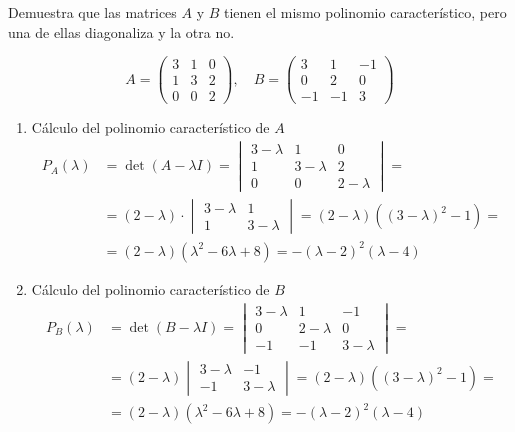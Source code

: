 \documentclass[12pt]{article}
\begin{document}
	\begin{ejercicio}[2 puntos]
		Demuestra que las matrices $A$ y $B$ tienen el mismo polinomio característico, pero una de ellas diagonaliza y la otra no.
		
		\[
		A = \begin{pmatrix}
			3 & 1 & 0 \\
			1 & 3 & 2 \\
			0 & 0 & 2
		\end{pmatrix}, \quad
		B = \begin{pmatrix}
			3 & 1 & -1 \\
			0 & 2 & 0 \\
			-1 & -1 & 3
		\end{pmatrix}
		\]

		\begin{enumerate}
			\item Cálculo del polinomio característico de \( A \)
			\begin{align*}
				P_A(\lambda) &= \det(A - \lambda I) =
				\begin{vmatrix}
					3 - \lambda & 1 & 0 \\
					1 & 3 - \lambda & 2 \\
					0 & 0 & 2 - \lambda
				\end{vmatrix}
				=\\&= (2 - \lambda) \cdot \begin{vmatrix}
					3 - \lambda & 1 \\
					1 & 3 - \lambda
				\end{vmatrix}
				= (2 - \lambda) \left((3 - \lambda)^2 - 1\right)
				=\\&= (2 - \lambda)\left(\lambda^2 - 6\lambda + 8\right)
				= -(\lambda - 2)^2(\lambda - 4)
			\end{align*}
		\item Cálculo del polinomio característico de \( B \)
		\begin{align*}
			P_B(\lambda) &= \det(B - \lambda I) =
			\begin{vmatrix}
				3 - \lambda & 1 & -1 \\
				0 & 2 - \lambda & 0 \\
				-1 & -1 & 3 - \lambda
			\end{vmatrix}
			=\\&= (2 - \lambda)
			\begin{vmatrix}
				3 - \lambda & -1 \\
				-1 & 3 - \lambda
			\end{vmatrix}
			= (2 - \lambda)\left((3 - \lambda)^2 - 1\right)
			=\\&= (2 - \lambda)(\lambda^2 - 6\lambda + 8)
			= -(\lambda - 2)^2(\lambda - 4)
		\end{align*}
	\end{enumerate}
		

\end{ejercicio}
\end{document}
